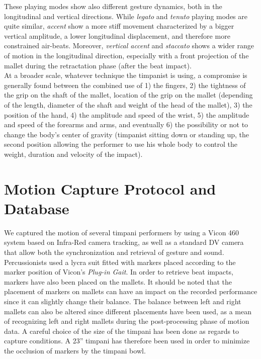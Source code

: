 These playing modes show also different gesture dynamics, both in the longitudinal and vertical directions. While \emph{legato} and \emph{tenuto} playing modes are quite similar, \emph{accent} show a more stiff movement characterized by a bigger vertical amplitude, a lower longitudinal displacement, and therefore more constrained air-beats. Moreover, \emph{vertical accent} and \emph{staccato} shows a wider range of motion in the longitudinal direction, especially with a front projection of the mallet during the retractation phase (after the beat impact).\\

At a broader scale, whatever technique the timpanist is using, a compromise is generally found between the combined use of 1) the fingers, 2) the tightness of the grip on the shaft of the mallet, location of the grip on the mallet (depending of the length, diameter of the shaft and weight of the head of the mallet), 3) the position of the hand, 4) the amplitude and speed of the wrist, 5) the amplitude and speed of the forearms and arms, and eventually 6) the possibility or not to change the body's center of gravity (timpanist sitting down or standing up, the second position allowing the performer to use his whole body to control the weight, duration and velocity of the impact). 





	\section{Motion Capture Protocol and Database}
	\label{sec:Analysis_MoCapDatabase}



We captured the motion of several timpani performers by using a Vicon 460 system  based on Infra-Red camera tracking, as well as a standard DV camera that allow both the synchronization and retrieval of gesture and sound. Percussionists used a lycra suit fitted with markers placed according to the marker position of Vicon's \emph{Plug-in Gait}.  In order to retrieve beat impacts, markers have also been placed on the mallets. It should be noted that the placement of markers on mallets can have an impact on the recorded performance since it can slightly change their balance. The balance between left and right mallets can also be altered since different placements have been used, as a mean of recognizing left and right mallets during the post-processing phase of motion data. A careful choice of the size of the timpani has been done as regards to capture conditions. A 23'' timpani has therefore been used in order to minimize the occlusion of markers by the timpani bowl.\\

